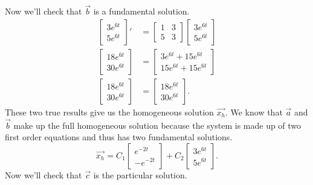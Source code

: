 Now we'll check that $\vec{b}$ is a fundamental solution.
\begin{align*}
	\begin{bmatrix}
		3e^{6t} \\
		5e^{6t}
	\end{bmatrix}' &= \begin{bmatrix}
		1 & 3 \\
		5 & 3
	\end{bmatrix} \begin{bmatrix}
		3e^{6t} \\
		5e^{6t}
	\end{bmatrix} \\
	\begin{bmatrix}
		18e^{6t} \\
		30e^{6t}
	\end{bmatrix} &= \begin{bmatrix}
		3e^{6t} + 15e^{6t} \\
		15e^{6t} + 15e^{6t}
	\end{bmatrix} \\
	\begin{bmatrix}
		18e^{6t} \\
		30e^{6t}
	\end{bmatrix} &= \begin{bmatrix}
		18e^{6t} \\
		30e^{6t}
	\end{bmatrix}.
\end{align*}
These two true results give us the homogeneous solution $\vec{x_h}$.
We know that $\vec{a}$ and $\vec{b}$ make up the full homogeneous solution because the system is made up of two first order equations and thus has two fundamental solutions.
\begin{equation*}
	\vec{x_h} = C_1\begin{bmatrix}
		e^{-2t} \\
		-e^{-2t}
	\end{bmatrix} + C_2\begin{bmatrix}
		3e^{6t} \\
		5e^{6t}
	\end{bmatrix}.
\end{equation*}
Now we'll check that $\vec{c}$ is the particular solution.
